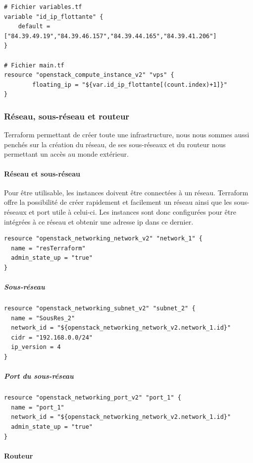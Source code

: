 \documentclass[]{article}
\let\oldparagraph\paragraph
\renewcommand{\paragraph}[1]{\oldparagraph{#1}\mbox{}}
\let\oldsubparagraph\subparagraph
\renewcommand{\subparagraph}[1]{\oldsubparagraph{#1}\mbox{}}
\begin{document}
\begin{verbatim}
# Fichier variables.tf
variable "id_ip_flottante" {
    default = ["84.39.49.19","84.39.46.157","84.39.44.165","84.39.41.206"]
}

# Fichier main.tf
resource "openstack_compute_instance_v2" "vps" {
        floating_ip = "${var.id_ip_flottante[(count.index)+1]}"
}
\end{verbatim}

\subsubsection{Réseau, sous-réseau et
routeur}\label{ruxe9seau-sous-ruxe9seau-et-routeur}

Terraform permettant de créer toute une infrastructure, nous nous sommes
aussi penchés sur la création du réseau, de ses sous-réseaux et du
routeur nous permettant un accès au monde extérieur.

\paragraph{Réseau et sous-réseau}\label{ruxe9seau-et-sous-ruxe9seau}

Pour être utilisable, les instances doivent être connectées à un réseau.
Terraform offre la possibilité de créer rapidement et facilement un
réseau ainsi que les sous-réseaux et port utile à celui-ci. Les
instances sont donc configurées pour être intégrées à ce réseau et
obtenir une adresse ip dans ce dernier. 
\begin{verbatim}
resource "openstack_networking_network_v2" "network_1" {
  name = "resTerraform"
  admin_state_up = "true"
}
\end{verbatim}

\subparagraph{Sous-réseau}\label{sous-ruxe9seau}
\begin{verbatim}
resource "openstack_networking_subnet_v2" "subnet_2" {
  name = "SousRes_2"
  network_id = "${openstack_networking_network_v2.network_1.id}"
  cidr = "192.168.0.0/24"
  ip_version = 4 
}
\end{verbatim}

\subparagraph{Port du sous-réseau}\label{port-du-sous-ruxe9seau}
\begin{verbatim}
resource "openstack_networking_port_v2" "port_1" {
  name = "port_1"
  network_id = "${openstack_networking_network_v2.network_1.id}"
  admin_state_up = "true"
}
\end{verbatim}

\paragraph{Routeur}\label{routeur}
\end{document}
